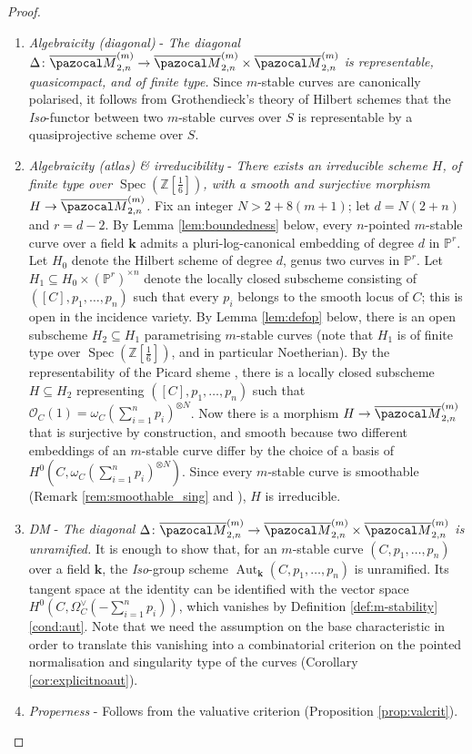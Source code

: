 \documentclass{compositio}
\newcommand{\PP}{\mathbb P}
\renewcommand{\k}{\mathbf k}
\newcommand{\OO}{\mathcal O}
\renewcommand{\to}{\rightarrow}
\newcommand{\oM}{\overline{\pazocal M}}
\theoremstyle{plain}
\theoremstyle{definition}
\theoremstyle{remark}
\begin{document}
\begin{proof}
 \begin{enumerate}
  \item \emph{Algebraicity (diagonal)} - \emph{The diagonal $\Delta\colon \oM_{2,n}^{(m)}\to \oM_{2,n}^{(m)}\times\oM_{2,n}^{(m)}$ is representable, quasicompact, and of finite type.} Since $m$-stable curves are canonically polarised, it follows from Grothendieck's theory of Hilbert schemes that the \emph{Iso}-functor between two $m$-stable curves over $S$ is representable by a quasiprojective scheme over $S$.
  
  \item \emph{Algebraicity (atlas) \& irreducibility} - \emph{There exists an irreducible scheme $H$, of finite type over $\operatorname{Spec}(\mathbb Z[\frac{1}{6}])$, with a smooth and surjective morphism $H\to \oM_{2,n}^{(m)}$.} Fix an integer $N>2+8(m+1)$; let $d=N(2+n)$ and $r=d-2$. By Lemma \ref{lem:boundedness} below, every $n$-pointed $m$-stable curve over a field $\k$ admits a pluri-log-canonical embedding of degree $d$ in $\PP^r$. Let $H_0$ denote the Hilbert scheme of degree $d$, genus two curves in $\PP^r$. Let $H_1\subseteq H_0\times(\PP^r)^{\times n}$ denote the locally closed subscheme consisting of $([C],p_1,\ldots,p_n)$ such that every $p_i$ belongs to the smooth locus of $C$; this is open in the incidence variety. By Lemma \ref{lem:defop} below, there is an open subscheme $H_2\subseteq H_1$ parametrising $m$-stable curves (note that $H_1$ is of finite type over $\operatorname{Spec}(\mathbb Z[\frac{1}{6}])$, and in particular Noetherian). By the representability of the Picard sheme \cite[Proposition 5.1]{GIT}, there is a locally closed subscheme $H\subseteq H_2$ representing $([C],p_1,\ldots,p_n)$ such that $\OO_C(1)=\omega_C(\sum_{i=1}^np_i)^{\otimes N}$. Now there is a morphism $H\to \oM_{2,n}^{(m)}$ that is surjective by construction, and smooth because two different embeddings of an $m$-stable curve differ by the choice of a basis of $H^0(C,\omega_C(\sum_{i=1}^np_i)^{\otimes N})$. Since every $m$-stable curve is smoothable (Remark \ref{rem:smoothable_sing} and \cite[I.6.10]{Kollar-rational}), $H$ is irreducible.
  
  \item \emph{DM} - \emph{The diagonal $\Delta\colon \oM_{2,n}^{(m)}\to \oM_{2,n}^{(m)}\times\oM_{2,n}^{(m)}$ is unramified.} It is enough to show that, for an $m$-stable curve $(C,p_1,\ldots,p_n)$ over a field $\k$, the \emph{Iso}-group scheme $\operatorname{Aut}_{\k}(C,p_1,\ldots,p_n)$ is unramified. Its tangent space at the identity can be identified with the vector space $H^0(C,\Omega_C^\vee(-\sum_{i=1}^n p_i))$, which vanishes by Definition \ref{def:m-stability}\ref{cond:aut}. Note that we need the assumption on the base characteristic in order to translate this vanishing into a combinatorial criterion on the pointed normalisation and singularity type of the curves (Corollary \ref{cor:explicitnoaut}).
  
  \item \emph{Properness} - Follows from the valuative criterion (Proposition \ref{prop:valcrit}).
 \end{enumerate}

\end{proof}
\end{document}
